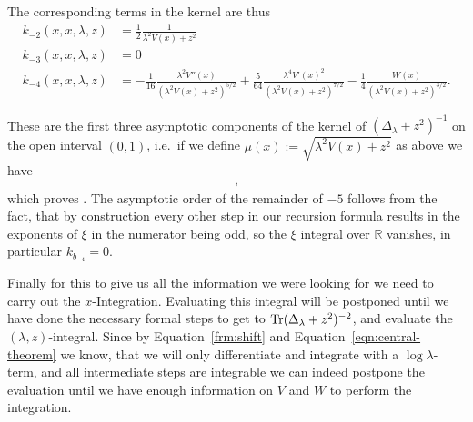 The corresponding terms in the kernel are thus
\begin{align}
  k_{-2}(x,x,\lambda,z) &= \frac{1}{2} \frac{1}{\lambda^2 V(x) + z^2} \\
  k_{-3}(x,x,\lambda,z) &= 0 \\
  k_{-4}(x,x,\lambda,z) &= - \frac{1}{16} \frac{\lambda^2 V''(x)}{(\lambda^2
    V(x) + z^2)^{5/2}} + \frac{5}{64} \frac{\lambda^4 V'(x)^2}{(\lambda^2V(x)
    + z^2)^{7/2}} -\frac{1}{4}\frac{W(x)}{(\lambda^2 V(x) + z^2)^{3/2}}.
  \label{eqn:coeff-kernel}
\end{align}

These are the first three asymptotic components of the kernel of
$(\Delta_\lambda + z^2)^{-1}$ on the open interval $(0,1)$, i.e.\ if we define
$\mu(x) := \sqrt{\lambda^2 V(x) + z^2}$ as above we have
\begin{align*}
  ,
\end{align*}
which proves .  The asymptotic order of the remainder of
$-5$ follows from the fact, that by construction every other step in our
recursion formula results in the exponents of $\xi$ in the numerator being odd,
so the $\xi$ integral over $\mathbb{R}$ vanishes, in particular $k_{b_{-4}} =
0$.

Finally for this to give us all the information we were looking for we need to
carry out the $x$-Integration. Evaluating this integral will be postponed until
we have done the necessary formal steps to get to $\operatorname{Tr}(\Delta_\lambda +
z^2)^{-2}$, and evaluate the $(\lambda,z)$-integral. Since by
Equation~\eqref{frm:shift} and Equation~\eqref{eqn:central-theorem} we know,
that we will only differentiate and integrate with a $\log\lambda$-term, and all
intermediate steps are integrable we can indeed postpone the evaluation until we
have enough information on $V$ and $W$ to perform the integration.

